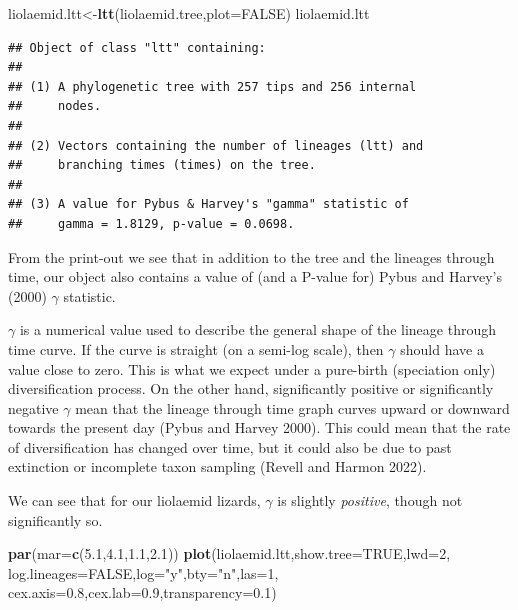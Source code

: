 \documentclass[fleqn,10pt,lineno]{wlpeerj} %
\newenvironment{Shaded}{\begin{snugshade}}{\end{snugshade}}
\newcommand{\AttributeTok}[1]{\textcolor[rgb]{0.13,0.29,0.53}{#1}}
\newcommand{\ConstantTok}[1]{\textcolor[rgb]{0.56,0.35,0.01}{#1}}
\newcommand{\DecValTok}[1]{\textcolor[rgb]{0.00,0.00,0.81}{#1}}
\newcommand{\FloatTok}[1]{\textcolor[rgb]{0.00,0.00,0.81}{#1}}
\newcommand{\FunctionTok}[1]{\textcolor[rgb]{0.13,0.29,0.53}{\textbf{#1}}}
\newcommand{\NormalTok}[1]{#1}
\newcommand{\OtherTok}[1]{\textcolor[rgb]{0.56,0.35,0.01}{#1}}
\newcommand{\StringTok}[1]{\textcolor[rgb]{0.31,0.60,0.02}{#1}}
\begin{document}
\begin{Shaded}
\begin{Highlighting}[]
\NormalTok{liolaemid.ltt}\OtherTok{\textless{}{-}}\FunctionTok{ltt}\NormalTok{(liolaemid.tree,}\AttributeTok{plot=}\ConstantTok{FALSE}\NormalTok{)}
\NormalTok{liolaemid.ltt}
\end{Highlighting}
\end{Shaded}

\begin{verbatim}
## Object of class "ltt" containing:
## 
## (1) A phylogenetic tree with 257 tips and 256 internal
##     nodes.
## 
## (2) Vectors containing the number of lineages (ltt) and
##     branching times (times) on the tree.
## 
## (3) A value for Pybus & Harvey's "gamma" statistic of
##     gamma = 1.8129, p-value = 0.0698.
\end{verbatim}

From the print-out we see that in addition to the tree and the lineages through time, our object also contains a value of (and a P-value for) Pybus and Harvey's (2000) \(\gamma\) statistic.

\(\gamma\) is a numerical value used to describe the general shape of the lineage through time curve. If the curve is straight (on a semi-log scale), then \(\gamma\) should have a value close to zero. This is what we expect under a pure-birth (speciation only) diversification process. On the other hand, significantly positive or significantly negative \(\gamma\) mean that the lineage through time graph curves upward or downward towards the present day (Pybus and Harvey 2000). This could mean that the rate of diversification has changed over time, but it could also be due to past extinction or incomplete taxon sampling (Revell and Harmon 2022).

We can see that for our liolaemid lizards, \(\gamma\) is slightly \emph{positive}, though not significantly so.

\begin{Shaded}
\begin{Highlighting}[]
\FunctionTok{par}\NormalTok{(}\AttributeTok{mar=}\FunctionTok{c}\NormalTok{(}\FloatTok{5.1}\NormalTok{,}\FloatTok{4.1}\NormalTok{,}\FloatTok{1.1}\NormalTok{,}\FloatTok{2.1}\NormalTok{))}
\FunctionTok{plot}\NormalTok{(liolaemid.ltt,}\AttributeTok{show.tree=}\ConstantTok{TRUE}\NormalTok{,}\AttributeTok{lwd=}\DecValTok{2}\NormalTok{,}
  \AttributeTok{log.lineages=}\ConstantTok{FALSE}\NormalTok{,}\AttributeTok{log=}\StringTok{"y"}\NormalTok{,}\AttributeTok{bty=}\StringTok{"n"}\NormalTok{,}\AttributeTok{las=}\DecValTok{1}\NormalTok{,}
  \AttributeTok{cex.axis=}\FloatTok{0.8}\NormalTok{,}\AttributeTok{cex.lab=}\FloatTok{0.9}\NormalTok{,}\AttributeTok{transparency=}\FloatTok{0.1}\NormalTok{)}
\end{Highlighting}
\end{Shaded}
\end{document}
